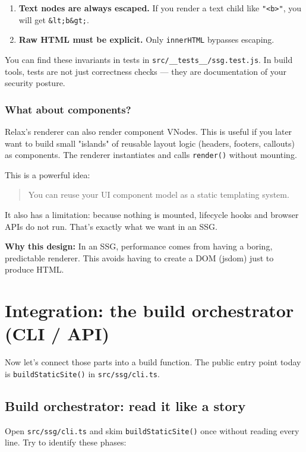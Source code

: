 \begin{enumerate}
  \item \textbf{Text nodes are always escaped.} If you render a text child like \texttt{"<b>"}, you will get \texttt{\&lt;b\&gt;}.
  \item \textbf{Raw HTML must be explicit.} Only \texttt{innerHTML} bypasses escaping.
\end{enumerate}

You can find these invariants in tests in \texttt{src/\_\_tests\_\_/ssg.test.js}.
In build tools, tests are not just correctness checks --- they are documentation of your security posture.

\subsubsection{What about components?}
Relax's renderer can also render component VNodes.
This is useful if you later want to build small "islands" of reusable layout logic (headers, footers, callouts) as components.
The renderer instantiates and calls \texttt{render()} without mounting.

This is a powerful idea:

\begin{quote}
You can reuse your UI component model as a static templating system.
\end{quote}

It also has a limitation: because nothing is mounted, lifecycle hooks and browser APIs do not run.
That's exactly what we want in an SSG.

\textbf{Why this design:}
In an SSG, performance comes from having a boring, predictable renderer.
This avoids having to create a DOM (jsdom) just to produce HTML.

\section{Integration: the build orchestrator (CLI / API)}
Now let's connect those parts into a build function.
The public entry point today is \texttt{buildStaticSite()} in \texttt{src/ssg/cli.ts}.

\subsection{Build orchestrator: read it like a story}
Open \texttt{src/ssg/cli.ts} and skim \texttt{buildStaticSite()} once without reading every line.
Try to identify these phases:

